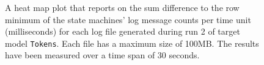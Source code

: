 \begin{figure}[htbp]
\centering
\begin{minipage}{1\textwidth}
  \centering
\end{minipage}
\caption{A heat map plot that reports on the sum difference to the row minimum of the state machines' log message counts per time unit (milliseconds) for each log file generated during run 2 of target model \texttt{Tokens}. Each file has a maximum size of 100MB. The results have been measured over a time span of 30 seconds.}
\label{figure:throughput_difference_tokens_2}
\end{figure}